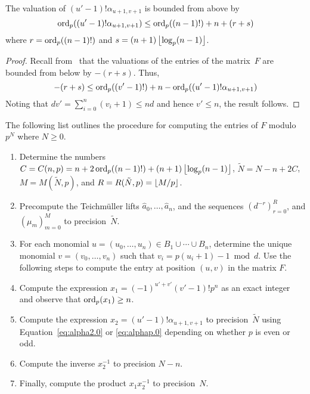\begin{prop}
The valuation of $(u'-1)! \alpha_{u+1,v+1}$ is bounded from above by 
\begin{equation*}
\operatorname{ord}_p((u'-1)! \alpha_{u+1,v+1}) \leq \operatorname{ord}_p((n-1)!) + n + (r + s)
\end{equation*}
where $r = \operatorname{ord}_p((n-1)!)$ and $s = (n+1) \left\lfloor\log_p(n-1)\right\rfloor$. 
\end{prop}

\begin{proof}
Recall from~\citep[Lemma~3.3]{Gerkmann2007} that the valuations 
of the entries of the matrix~$F$ are bounded from below by $-(r+s)$. 
Thus,
\begin{equation*}
-(r+s) \leq \operatorname{ord}_p((v'-1)!) + n - \operatorname{ord}_p((u'-1)! \alpha_{u+1,v+1})
\end{equation*}
Noting that $d v' = \sum_{i=0}^n (v_i + 1) \leq n d$ and 
hence $v' \leq n$, the result follows.
\end{proof}

The following list outlines the procedure for computing 
the entries of $F$ modulo $p^N$ where $N \geq 0$.

\begin{enumerate}
\item Determine the numbers 
      $C = C(n,p) = n + 2 \operatorname{ord}_p((n-1)!) + (n+1) \left\lfloor\log_p(n-1)\right\rfloor$, 
      $\tilde{N} = N - n + 2 C$, $M = M(\tilde{N}, p)$, and 
      $R = R(\tilde{N}, p) = \left\lfloor M/p\right\rfloor$.
\item Precompute the Teichm\"uller lifts $\hat{a}_0, \dotsc, \hat{a}_n$, 
      and the sequences $(d^{-r})_{r=0}^R$, and $(\mu_m)_{m=0}^{M}$ 
      to precision~$\tilde{N}$.
\item For each monomial $u = (u_0, \dotsc, u_n) \in B_1 \cup \dotsb \cup B_n$, 
      determine the unique monomial $v = (v_0, \dotsc, v_n)$ such that 
      $v_i = p (u_i + 1) - 1 \bmod{d}$.  Use the following steps to 
      compute the entry at position $(u,v)$ in the matrix $F$.
\item Compute the expression $x_1 = (-1)^{u'+v'} (v'-1)! p^n$ as an 
      exact integer and observe that \mbox{$\operatorname{ord}_p(x_1) \geq n$}.
\item Compute the expression $x_2 = (u' - 1)! \alpha_{u+1,v+1}$ to 
      precision~$\tilde{N}$ using Equation~\eqref{eq:alpha2.0} or 
      \eqref{eq:alphap.0} depending on whether $p$ is even or odd. 
\item Compute the inverse $x_2^{-1}$ to precision $N - n$.
\item Finally, compute the product $x_1 x_2^{-1}$ to precision~$N$.
\end{enumerate}

